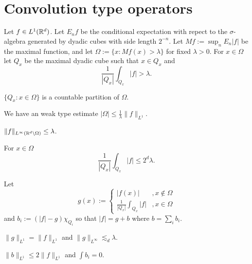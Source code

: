 \documentclass{../../large}
\begin{document}
\section{Convolution type operators}

\begin{prb}
\end{prb}

\begin{prb}
Let $f\in L^1(\mathbb{R}^d)$.
Let $E_nf$ be the conditional expectation with repect to the $\sigma$-algebra generated by dyadic cubes with side length $2^{-n}$.
Let $Mf:=\sup_nE_n|f|$ be the maximal function, and let $\Omega:=\{x:Mf(x)>\lambda\}$ for fixed $\lambda>0$.
For $x\in\Omega$ let $Q_x$ be the maximal dyadic cube such that $x\in Q_x$ and
\[\frac1{|Q_x|}\int_{Q_x}|f|>\lambda.\]
\begin{parts}
\item
$\{Q_x:x\in\Omega\}$ is a countable partition of $\Omega$.
\item
We have an weak type estimate $|\Omega|\le\frac1\lambda\|f\|_{L^1}$.
\item
$\|f\|_{L^\infty(\mathbb{R}^d\setminus\Omega)}\le\lambda$.
\item
For $x\in\Omega$
\[\frac1{|Q_x|}\int_{Q_x}|f|\le2^d\lambda.\]
\end{parts}
\end{prb}

\begin{prb}
Let
\[g(x):=\begin{cases}|f(x)|&,x\notin\Omega\\\frac1{|Q_x|}\int_{Q_x}|f|&,x\in\Omega\end{cases}\]
and $b_i:=(|f|-g)\chi_{Q_i}$ so that $|f|=g+b$ where $b=\sum_ib_i$.
\begin{parts}
\item $\|g\|_{L^1}=\|f\|_{L^1}$ and $\|g\|_{L^\infty}\lesssim_d\lambda$.
\item $\|b\|_{L^1}\le2\|f\|_{L^1}$ and $\int b_i=0$.
\end{parts}
\end{prb}
\begin{pf}

\end{pf}
\end{document}
